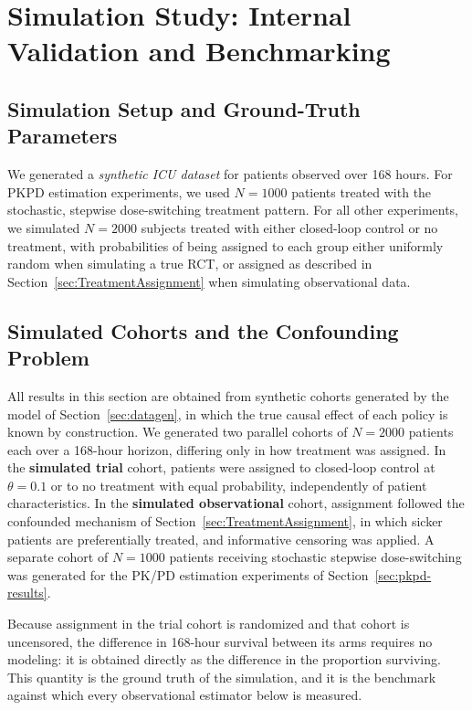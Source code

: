 \section{Simulation Study: Internal Validation and Benchmarking}
\label{sec:results}

\subsection{Simulation Setup and Ground-Truth Parameters}

We generated a \textit{synthetic ICU dataset} for patients observed over 168 hours. For PKPD estimation experiments, we used $N=1000$ patients treated with the stochastic, stepwise dose-switching treatment pattern. For all other experiments, we simulated $N=2000$ subjects treated with either closed-loop control or no treatment, with probabilities of being assigned to each group either uniformly random when simulating a true RCT, or assigned as described in Section~\ref{sec:TreatmentAssignment} when simulating observational data.


\subsection{Simulated Cohorts and the Confounding Problem}
\label{sec:cohorts}

All results in this section are obtained from synthetic cohorts generated by the model of
Section~\ref{sec:datagen}, in which the true causal effect of each policy is known by construction.
We generated two parallel cohorts of $N = 2000$ patients each over a 168-hour horizon, differing only
in how treatment was assigned. In the \textbf{simulated trial} cohort, patients were assigned to
closed-loop control at $\theta = 0.1$ or to no treatment with equal probability, independently of
patient characteristics. In the \textbf{simulated observational} cohort, assignment followed the
confounded mechanism of Section~\ref{sec:TreatmentAssignment}, in which sicker patients are
preferentially treated, and informative censoring was applied. A separate cohort of $N = 1000$
patients receiving stochastic stepwise dose-switching was generated for the PK/PD estimation
experiments of Section~\ref{sec:pkpd-results}.

Because assignment in the trial cohort is randomized and that cohort is uncensored, the difference in
168-hour survival between its arms requires no modeling: it is obtained directly as the difference in
the proportion surviving. This quantity is the ground truth of the simulation, and it is the benchmark
against which every observational estimator below is measured.

